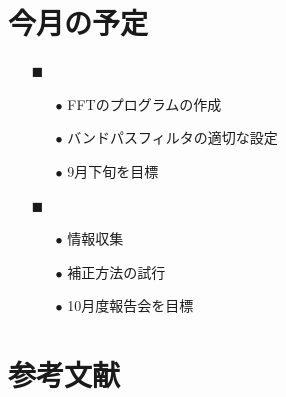 \documentclass[twocolumn,a4j]{jsarticle}
\begin{document}
\section{今月の予定}
\begin{itemize}
    \item [$\blacksquare$] 
    \begin{itemize}
        \item [$\bullet$] FFTのプログラムの作成
        \item [$\bullet$] バンドパスフィルタの適切な設定
        \item [$\bullet$] 9月下旬を目標
    \end{itemize}
    \item [$\blacksquare$] 
    \begin{itemize}
        \item [$\bullet$] 情報収集
        \item [$\bullet$] 補正方法の試行
        \item [$\bullet$] 10月度報告会を目標
    \end{itemize}
\end{itemize}

\section{参考文献}
\end{document}
